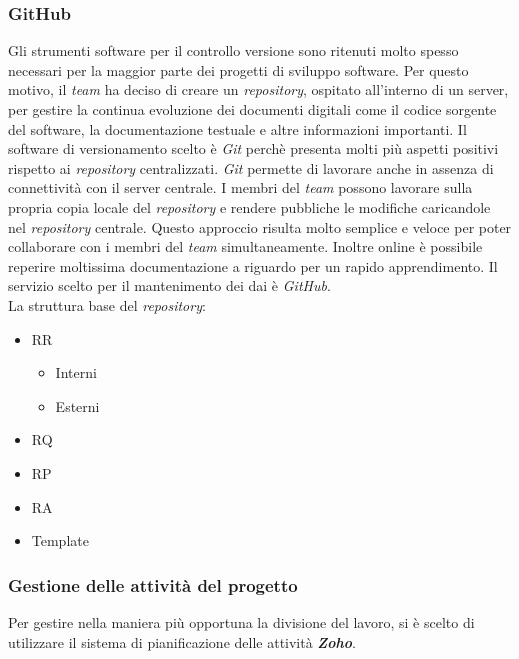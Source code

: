 \subsubsection{GitHub}
Gli strumenti software per il controllo versione sono ritenuti molto spesso necessari per la maggior parte dei progetti di sviluppo software.
Per questo motivo, il \textit{team} ha deciso di creare un \textit{repository}, ospitato all'interno di un server, per gestire la continua evoluzione dei documenti digitali come il codice sorgente del software, la documentazione testuale e altre informazioni importanti.
Il software di versionamento scelto è \textit{Git} perchè presenta molti più aspetti positivi rispetto ai \textit{repository} centralizzati. \textit{Git} permette di lavorare anche in assenza di connettività con il server centrale. I membri del \textit{team} possono lavorare sulla propria copia locale del \textit{repository} e rendere pubbliche le modifiche caricandole nel \textit{repository} centrale. Questo approccio risulta molto semplice e veloce per poter collaborare con i membri del \textit{team} simultaneamente.
Inoltre online è possibile reperire moltissima documentazione a riguardo per un rapido apprendimento. Il servizio scelto per il mantenimento dei dai è \textit{GitHub}. \\La struttura base del \textit{repository}:
\begin{itemize}
  \item
	RR
	\begin{itemize}
		\item
			Interni
		\item
			Esterni
	\end{itemize}
  \item
    RQ
  \item
    RP
  \item
  	RA
  \item
  	Template 
\end{itemize} 

\subsubsection{Gestione delle attività del progetto}
Per gestire nella maniera più opportuna la divisione del lavoro, si è scelto di 
utilizzare il sistema di pianificazione delle attività \textit{\textbf{Zoho}}.

